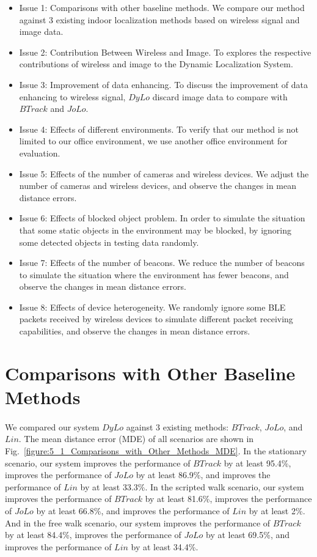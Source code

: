 \documentclass[a4paper,12pt]{report}
\begin{document}
\begin{itemize}
\item  Issue 1: Comparisons with other baseline methods. We compare our method against 3 existing indoor localization methods based on wireless signal and image data.
\item  Issue 2: Contribution Between Wireless and Image. To explores the respective contributions of wireless and image to the Dynamic Localization System.
\item  Issue 3: Improvement of data enhancing. To discuss the improvement of data enhancing to wireless signal, $DyLo$ discard image data to compare with $BTrack$ and $JoLo$.
\item  Issue 4: Effects of different environments. To verify that our method is not limited to our office environment, we use another office environment for evaluation.
\item  Issue 5: Effects of the number of cameras and wireless devices. We adjust the number of cameras and wireless devices, and observe the changes in mean distance errors.
\item  Issue 6: Effects of blocked object problem. In order to simulate the situation that some static objects in the environment may be blocked, by ignoring some detected objects in testing data randomly.
\item  Issue 7: Effects of the number of beacons. We reduce the number of beacons to simulate the situation where the environment has fewer beacons, and observe the changes in mean distance errors.
\item  Issue 8: Effects of device heterogeneity. We randomly ignore some BLE packets received by wireless devices to simulate different packet receiving capabilities, and observe the changes in mean distance errors.
\end{itemize}
%

\section{Comparisons with Other Baseline Methods}

\paragraph{}
We compared our system $DyLo$ against 3 existing methods: $BTrack$, $JoLo$, and $Lin$. The mean distance error (MDE) of all scenarios are shown in Fig.~\ref{figure:5_1_Comparisons_with_Other_Methods_MDE}. In the stationary scenario, our system improves the performance of $BTrack$ by at least 95.4\%, improves the performance of $JoLo$ by at least 86.9\%, and improves the performance of $Lin$ by at least 33.3\%. In the scripted walk scenario, our system improves the performance of $BTrack$ by at least 81.6\%, improves the performance of $JoLo$ by at least 66.8\%, and improves the performance of $Lin$ by at least 2\%. And in the free walk scenario, our system improves the performance of $BTrack$ by at least 84.4\%, improves the performance of $JoLo$ by at least 69.5\%, and improves the performance of $Lin$ by at least 34.4\%.
\end{document}
